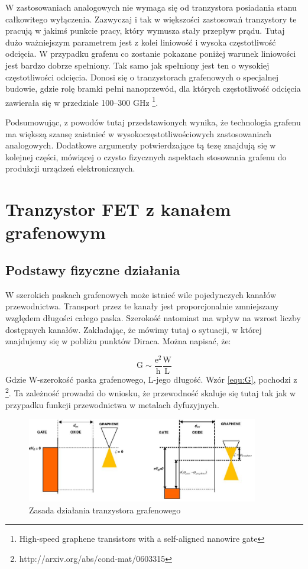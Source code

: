 W zastosowaniach analogowych nie wymaga się od tranzystora posiadania stanu całkowitego wyłączenia. Zazwyczaj i tak 
w większości zastosowań tranzystory te pracują w jakimś punkcie pracy, który wymusza stały przepływ prądu. Tutaj dużo 
ważniejszym parametrem jest z kolei liniowość i wysoka częstotliwość odcięcia. W przypadku grafenu co zostanie pokazane
poniżej warunek liniowości jest bardzo dobrze spełniony. Tak samo jak spełniony jest ten o wysokiej częstotliwości odcięcia.
Donosi się o tranzystorach grafenowych o specjalnej budowie, gdzie rolę bramki pełni nanoprzewód, dla których
częstotliwość odcięcia zawierała się w przedziale 100--300 GHz \footnote{High-speed graphene transistors with a self-aligned nanowire gate}.



Podsumowując, z powodów tutaj przedstawionych wynika, że technologia grafenu ma większą szansę zaistnieć 
w wysokoczęstotliwościowych zastosowaniach analogowych. Dodatkowe argumenty potwierdzające tą tezę znajdują się 
w kolejnej części, mówiącej o czysto fizycznych aspektach stosowania grafenu do produkcji urządzeń elektronicznych.

	\section{Tranzystor FET z kanałem grafenowym}
		\subsection{Podstawy fizyczne działania}


	
	W szerokich paskach grafenowych może istnieć wile pojedynczych kanałów przewodnictwa. Transport przez te kanały
	jest proporcjonalnie zmniejszany względem długości całego paska. Szerokość natomiast ma wpływ na wzrost liczby
	dostępnych kanałów. Zakładając, że mówimy tutaj o sytuacji, w której znajdujemy się w pobliżu punktów Diraca.
	Można napisać, że:

	\begin{equation}
    		\mathrm{ G \sim \frac{e^2}{h}\frac{W}{L} }
		\label{equ:G}
	\end{equation}
	Gdzie W-szerokość paska grafenowego, L-jego długość. Wzór \ref{equ:G}, pochodzi z \footnote{http://arxiv.org/abs/cond-mat/0603315}.
	Ta zależność prowadzi do wniosku, że przewodność skaluje się tutaj tak jak w przypadku funkcji przewodnictwa w 
	metalach dyfuzyjnych. 


		\begin{figure}[ht]
	\centering
	\includegraphics[width=0.90\textwidth]{./Rozdzial_3/obrazki/zasadadzialania.jpg}
	\caption{Zasada działania tranzystora grafenowego}
	\label{fig:MOSFET_dzialanie}
	\end{figure}

